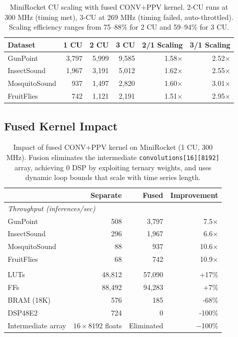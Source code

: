 \documentclass[11pt]{article}
\begin{document}
\begin{table}[H]
\centering
\caption{MiniRocket CU scaling with fused CONV+PPV kernel. 2-CU runs at 300 MHz (timing met), 3-CU at 269 MHz (timing failed, auto-throttled). Scaling efficiency ranges from 75--88\% for 2 CU and 59--94\% for 3 CU.}
\label{tab:cu_scaling}
\begin{tabular}{l r r r r r}
\toprule
Dataset & 1 CU & 2 CU & 3 CU & 2/1 Scaling & 3/1 Scaling \\
\midrule
GunPoint & 3{,}797 & 5{,}999 & 9{,}585 & 1.58$\times$ & 2.52$\times$ \\
InsectSound & 1{,}967 & 3{,}191 & 5{,}012 & 1.62$\times$ & 2.55$\times$ \\
MosquitoSound & 937 & 1{,}497 & 2{,}820 & 1.60$\times$ & 3.01$\times$ \\
FruitFlies & 742 & 1{,}121 & 2{,}191 & 1.51$\times$ & 2.95$\times$ \\
\bottomrule
\end{tabular}
\end{table}

\subsection{Fused Kernel Impact}

\begin{table}[H]
\centering
\caption{Impact of fused CONV+PPV kernel on MiniRocket (1 CU, 300 MHz). Fusion eliminates the intermediate \texttt{convolutions[16][8192]} array, achieving 0 DSP by exploiting ternary weights, and uses dynamic loop bounds that scale with time series length.}
\label{tab:fused}
\begin{tabular}{l r r r}
\toprule
& Separate & Fused & Improvement \\
\midrule
\multicolumn{4}{l}{\textit{Throughput (inferences/sec)}} \\
\quad GunPoint & 508 & 3{,}797 & 7.5$\times$ \\
\quad InsectSound & 296 & 1{,}967 & 6.6$\times$ \\
\quad MosquitoSound & 88 & 937 & 10.6$\times$ \\
\quad FruitFlies & 68 & 742 & 10.9$\times$ \\
\addlinespace
\multicolumn{4}{l}{\textit{Resource Utilization (HLS synthesis)}} \\
\quad LUTs & 48{,}812 & 57{,}090 & +17\% \\
\quad FFs & 88{,}492 & 94{,}283 & +7\% \\
\quad BRAM (18K) & 576 & 185 & -68\% \\
\quad DSP48E2 & 724 & 0 & -100\% \\
\addlinespace
\quad Intermediate array & $16 \times 8192$ floats & Eliminated & $-$100\% \\
\bottomrule
\end{tabular}
\end{table}
\end{document}
